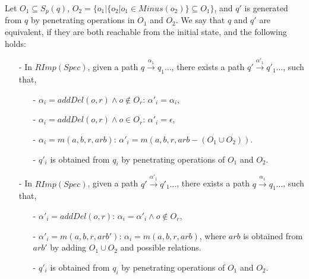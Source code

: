 Let $O_1 \subseteq S_p(q)$, $O_2 = \{ o_1 \vert  \{ o_2 \vert o_1 \in Minus(o_2) \} \subseteq O_1 \}$, and $q'$ is generated from $q$ by penetrating operations in $O_1$ and $O_2$. We say that $q$ and $q'$ are equivalent, if they are both reachable from the initial state, and the following holds:

\begin{itemize}
\setlength{\itemsep}{0.5pt}
\item[-] In $RImp(Spec)$, given a path $q {\xrightarrow{\alpha_1}} q_1 \ldots$, there exists a path $q' {\xrightarrow{\alpha'_1}} q'_1 \ldots$, such that,

    \begin{itemize}
    \setlength{\itemsep}{0.5pt}
    \item[-] $\alpha_i = addDel(o,r) \wedge o \notin O_r$: $\alpha'_i = \alpha_i$,

    \item[-] $\alpha_i = addDel(o,r) \wedge o \in O_r$: $\alpha'_i = \epsilon$,

    \item[-] $\alpha_i = m(a,b,r,arb)$: $\alpha'_i = m(a,b,r,arb-(O_1 \cup O_2))$.

    \item[-] $q'_i$ is obtained from $q_i$ by penetrating operations of $O_1$ and $O_2$.
    \end{itemize}

\item[-] In $RImp(Spec)$, given a path $q' {\xrightarrow{\alpha'_1}} q'_1 \ldots$, there exists a path $q {\xrightarrow{\alpha_1}} q_1 \ldots$, such that,

    \begin{itemize}
    \setlength{\itemsep}{0.5pt}
    \item[-] $\alpha'_i = addDel(o,r)$: $\alpha_i = \alpha'_i \wedge o \notin O_r$,


    \item[-] $\alpha'_i = m(a,b,r,arb')$: $\alpha_i = m(a,b,r,arb)$, where $arb$ is obtained from $arb'$ by adding $O_1 \cup O_2$ and possible relations.

    \item[-] $q'_i$ is obtained from $q_i$ by penetrating operations of $O_1$ and $O_2$.
    \end{itemize}
\end{itemize}



